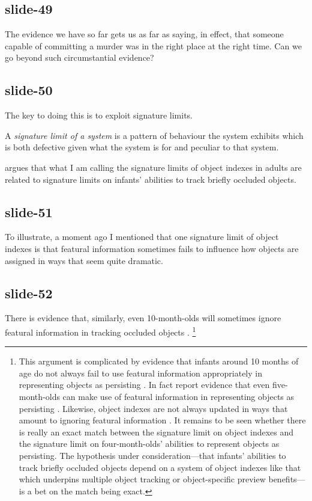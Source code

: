 \documentclass[12pt,\papersize]{extarticle}
\begin{document}
\subsection{slide-49}
The evidence we have so far gets us as far as saying, in effect, that someone capable of
committing a murder was in the right place at the right time.
Can we go beyond such circumstantial evidence?

\subsection{slide-50}
The key to doing this is to exploit signature limits.

A \emph{{signature limit} of a system} is a pattern of behaviour the system exhibits which is
both defective given what the system is for and peculiar to that system.

\citet{carey:2009_origin} argues that what I am calling the signature
limits of object indexes in adults are related to signature limits on
infants’ abilities to track briefly occluded objects.

\subsection{slide-51}
To illustrate, a moment ago I mentioned that one signature limit of
object indexes is that featural information sometimes fails to influence how objects are assigned in ways that seem quite dramatic.

\subsection{slide-52}
There is evidence that, similarly, even 10-month-olds will sometimes
ignore featural information in tracking occluded objects
\citep{xu:1996_infants}.%
\footnote{
This argument is complicated by evidence that infants around 10 months of age do not always fail
to use featural information appropriately in representing objects as persisting
\citep{wilcox:2002_infants}.
In fact \citet{mccurry:2009_beyond} report evidence that even five-month-olds can make use of
featural information in representing objects as persisting \citep[see also][]{wilcox:1999_object}.
Likewise, object indexes are not always updated in ways that amount to ignoring featural
information \citep{hollingworth:2009_object,moore:2010_features}.
It remains to be seen whether there is really an exact match between the signature limit on
object indexes and the signature limit on four-month-olds’ abilities to represent objects as
persisting.
The hypothesis under consideration---that infants’ abilities
to track briefly occluded objects depend on a system of
object indexes like that which underpins multiple object tracking or
object-specific preview benefits---is a bet on the match being exact.
}
\end{document}
